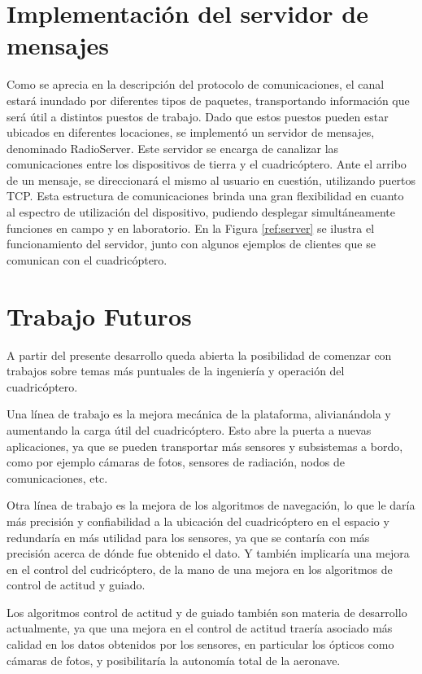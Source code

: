 \documentclass[a4paper, conference]{IEEEtran}
\begin{document}
\section{Implementación del servidor de mensajes}
Como se aprecia en la descripción del protocolo de comunicaciones, el canal estará inundado por diferentes tipos de paquetes, transportando información que será útil a distintos puestos de trabajo. Dado que estos puestos pueden estar ubicados en diferentes locaciones, se implementó un servidor de mensajes, denominado RadioServer. Este servidor se encarga de canalizar las comunicaciones entre los dispositivos de tierra y el cuadricóptero. Ante el arribo de un mensaje, se direccionará el mismo al usuario en cuestión, utilizando puertos TCP. Esta estructura de comunicaciones brinda una gran flexibilidad en cuanto al espectro de utilización del dispositivo, pudiendo desplegar simultáneamente funciones en campo y en laboratorio.
En la Figura \ref{ref:server} se ilustra el funcionamiento del servidor, junto con algunos ejemplos de clientes que se comunican con el cuadricóptero.

\vspace{5 mm}

\section{Trabajo Futuros}

A partir del presente desarrollo queda abierta la posibilidad de comenzar con trabajos sobre temas más puntuales de la ingeniería y operación del cuadricóptero. 

Una línea de trabajo es la mejora mecánica de la plataforma, alivianándola y aumentando la carga útil del cuadricóptero. Esto abre la puerta a nuevas aplicaciones, ya que se pueden transportar más sensores y subsistemas a bordo, como por ejemplo cámaras de fotos, sensores de radiación, nodos de comunicaciones, etc.

Otra línea de trabajo es la mejora de los algoritmos de navegación, lo que le daría más precisión y confiabilidad a la ubicación del cuadricóptero en el espacio y redundaría en más utilidad para los sensores, ya que se contaría con más precisión acerca de dónde fue obtenido el dato. Y también implicaría una mejora en el control del cudricóptero, de la mano de una mejora en los algoritmos de control de actitud y guiado.

Los algoritmos control de actitud y de guiado también son materia de desarrollo actualmente, ya que una mejora en el control de actitud traería asociado más calidad en los datos obtenidos por los sensores, en particular los ópticos como cámaras de fotos, y posibilitaría la autonomía total de la aeronave.
\end{document}
